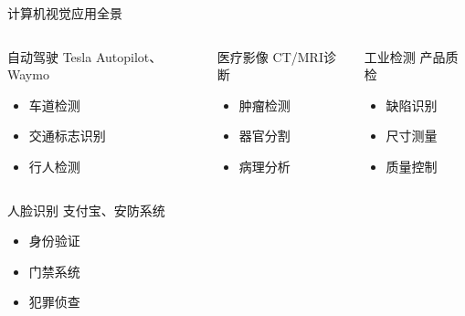 \begin{frame}[fragile]{计算机视觉应用全景}
    \begin{columns}
        \begin{block}{自动驾驶}
            Tesla Autopilot、Waymo
            \begin{itemize}
                \item 车道检测
                \item 交通标志识别
                \item 行人检测
            \end{itemize}
        \end{block}

        \begin{block}{医疗影像}
            CT/MRI诊断
            \begin{itemize}
                \item 肿瘤检测
                \item 器官分割
                \item 病理分析
            \end{itemize}
        \end{block}

        \begin{block}{工业检测}
            产品质检
            \begin{itemize}
                \item 缺陷识别
                \item 尺寸测量
                \item 质量控制
            \end{itemize}
        \end{block}
    \end{columns}

    \vspace{0.5cm}

    \begin{columns}
        \begin{block}{人脸识别}
            支付宝、安防系统
            \begin{itemize}
                \item 身份验证
                \item 门禁系统
                \item 犯罪侦查
            \end{itemize}
        \end{block}


\end{columns}
\end{frame}
